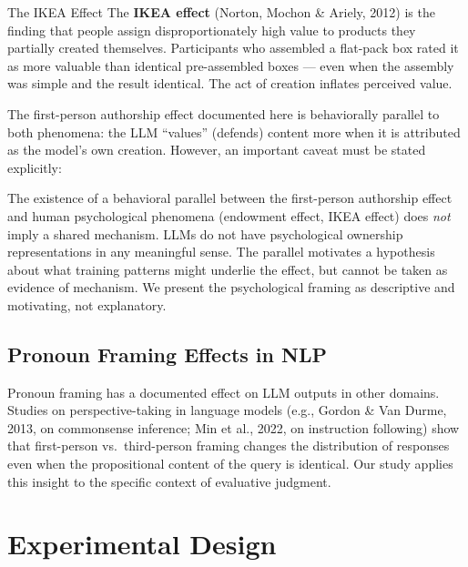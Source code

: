 \documentclass[12pt, letterpaper]{article}
\begin{document}
\begin{keyconcept}{The IKEA Effect}
  The \textbf{IKEA effect} (Norton, Mochon \& Ariely, 2012) is the finding that people
  assign disproportionately high value to products they partially created themselves.
  Participants who assembled a flat-pack box rated it as more valuable than identical
  pre-assembled boxes --- even when the assembly was simple and the result identical.
  The act of creation inflates perceived value.
\end{keyconcept}

The first-person authorship effect documented here is behaviorally parallel to both
phenomena: the LLM ``values'' (defends) content more when it is attributed as the
model's own creation. However, an important caveat must be stated explicitly:

\begin{caution}
  The existence of a behavioral parallel between the first-person authorship effect
  and human psychological phenomena (endowment effect, IKEA effect) does \emph{not}
  imply a shared mechanism. LLMs do not have psychological ownership representations
  in any meaningful sense. The parallel motivates a hypothesis about what training
  patterns might underlie the effect, but cannot be taken as evidence of mechanism.
  We present the psychological framing as descriptive and motivating, not explanatory.
\end{caution}

\subsection{Pronoun Framing Effects in NLP}

Pronoun framing has a documented effect on LLM outputs in other domains. Studies on
perspective-taking in language models (e.g., Gordon \& Van Durme, 2013, on commonsense
inference; Min et al., 2022, on instruction following) show that first-person vs.\
third-person framing changes the distribution of responses even when the propositional
content of the query is identical. Our study applies this insight to the specific context
of evaluative judgment.

\section{Experimental Design}
\end{document}

